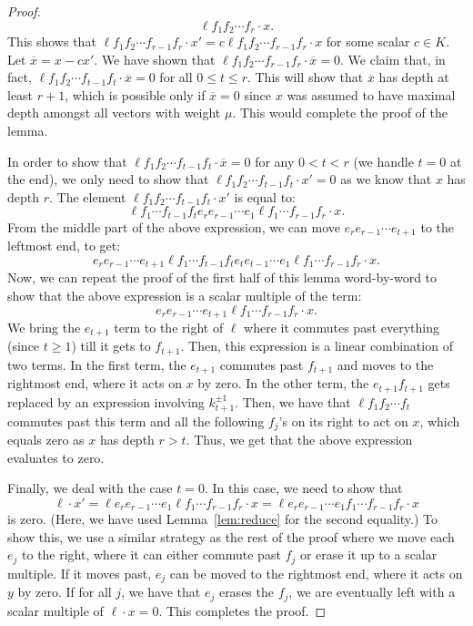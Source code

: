 \documentclass{amsart}
\numberwithin{equation}{section}
\theoremstyle{theorem}
\theoremstyle{definition}
\newcommand{\ol}{\overline}
\begin{document}
\begin{proof}
\[\ell f_1 f_2\cdots f_r\cdot x.\]
This shows that $\ell f_1 f_2\cdots f_{r-1} f_{r} \cdot x' = c \ell f_1 f_2\cdots f_{r-1} f_{r} \cdot x$ for some scalar $c\in K$. Let $\ol{x}=x-cx'$. We have shown that $\ell f_1 f_2\cdots f_{r-1} f_{r} \cdot \ol{x}=0$. We claim that, in fact, $\ell f_1 f_2\cdots f_{t-1} f_{t} \cdot \ol{x} =0$ for all $0\leq t\leq r$. This will show that $\ol{x}$ has depth at least $r+1$, which is possible only if $\ol{x}=0$ since $x$ was assumed to have maximal depth amongst all vectors with weight $\mu$. This would complete the proof of the lemma.

In order to show that $\ell f_1 f_2\cdots f_{t-1} f_{t} \cdot \ol{x} =0$ for any $0<t<r$ (we handle $t=0$ at the end), we only need to show that $\ell f_1 f_2\cdots f_{t-1} f_{t} \cdot x' =0$ as we know that $x$ has depth $r$. The element $\ell f_1 f_2\cdots f_{t-1} f_{t} \cdot x'$ is equal to:
\[\ell f_1\cdots f_{t-1} f_{t} e_{r} e_{r - 1}\cdots e_1 \ell f_1\cdots f_{r-1} f_{r} \cdot x.\]
From the middle part of the above expression, we can move $e_{r} e_{r-1}\cdots e_{t+1}$ to the leftmost end, to get:
\[e_{r} e_{r-1}\cdots e_{t+1}  \ell f_1\cdots f_{t-1} f_{t} e_{t} e_{t - 1}\cdots e_1 \ell f_1\cdots f_{r-1} f_{r} \cdot x.\]
Now, we can repeat the proof of the first half of this lemma word-by-word to show that the above expression is a scalar multiple of the term:
\[e_{r} e_{r-1}\cdots e_{t+1} \ell f_1\cdots f_{r-1} f_{r} \cdot x.\]
We bring the $e_{t+1}$ term to the right of $\ell$ where it commutes past everything (since $t\geq 1$) till it gets to $f_{t+1}$. Then, this expression is a linear combination of two terms. In the first term, the $e_{t+1}$ commutes past $f_{t+1}$ and moves to the rightmost end, where it acts on $x$ by zero. In the other term, the $e_{t+1} f_{t+1}$ gets replaced by an expression involving $k_{t+1}^{\pm1}$. Then, we have that $\ell f_1  f_2\cdots f_t$ commutes past this term and all the following $f_j$'s on its right to act on $x$, which equals zero as $x$ has depth $r>t$. Thus, we get that the above expression evaluates to zero.

Finally, we deal with the case $t=0$. In this case, we need to show that
\[\ell\cdot x' = \ell e_{r} e_{r- 1}\cdots e_1 \ell f_1\cdots f_{r-1} f_{r} \cdot x = \ell e_{r} e_{r - 1}\cdots e_1 f_1\cdots f_{r-1} f_{r} \cdot x\]
is zero. (Here, we have used Lemma~\ref{lem:reduce} for the second equality.) To show this, we use a similar strategy as the rest of the proof where we move each $e_j$ to the right, where it can either commute past $f_j$ or erase it up to a scalar multiple. If it moves past, $e_j$ can be moved to the rightmost end, where it acts on $y$ by zero. If for all $j$, we have that $e_j$ erases the $f_j$, we are eventually left with a scalar multiple of $\ell\cdot x=0$. This completes the proof.
\end{proof}
\end{document}
